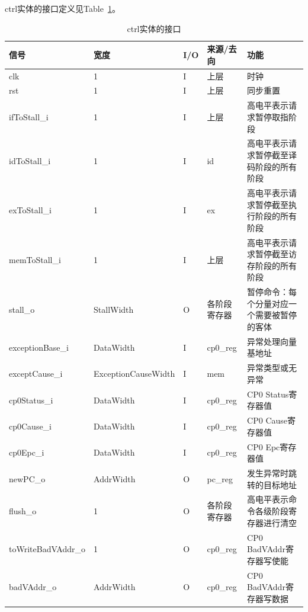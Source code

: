 \documentclass{article}
\begin{document}
\begin{spacing}{1.4}
ctrl实体的接口定义见Table~\ref{tb:ctrl-interface}。
\begin{table}[!htb]
\begin{center}
\begin{tabular*}{17cm}{l|l|l|l|p{5cm}}
\hline
\textbf{信号}&\textbf{宽度}&\textbf{I/O}&\textbf{来源/去向}&\textbf{功能} \\
\hline clk                     & 1                      & I     & 上层         & 时钟 \\
\hline rst                     & 1                      & I     & 上层         & 同步重置 \\
\hline ifToStall\_i            & 1                      & I     & 上层         & 高电平表示请求暂停取指阶段 \\
\hline idToStall\_i            & 1                      & I     & id           & 高电平表示请求暂停截至译码阶段的所有阶段 \\
\hline exToStall\_i            & 1                      & I     & ex           & 高电平表示请求暂停截至执行阶段的所有阶段 \\
\hline memToStall\_i           & 1                      & I     & 上层         & 高电平表示请求暂停截至访存阶段的所有阶段 \\
\hline stall\_o                & StallWidth             & O     & 各阶段寄存器 & 暂停命令：每个分量对应一个需要被暂停的客体 \\
\hline exceptionBase\_i        & DataWidth              & I     & cp0\_reg     & 异常处理向量基地址 \\
\hline exceptCause\_i          & ExceptionCauseWidth    & I     & mem          & 异常类型或无异常 \\
\hline cp0Status\_i            & DataWidth              & I     & cp0\_reg     & CP0 Status寄存器值 \\
\hline cp0Cause\_i             & DataWidth              & I     & cp0\_reg     & CP0 Cause寄存器值 \\
\hline cp0Epc\_i               & DataWidth              & I     & cp0\_reg     & CP0 Epc寄存器值 \\
\hline newPC\_o                & AddrWidth              & O     & pc\_reg      & 发生异常时跳转的目标地址 \\
\hline flush\_o                & 1                      & O     & 各阶段寄存器 & 高电平表示命令各级阶段寄存器进行清空 \\
\hline toWriteBadVAddr\_o      & 1                      & O     & cp0\_reg     & CP0 BadVAddr寄存器写使能 \\
\hline badVAddr\_o             & AddrWidth              & O     & cp0\_reg     & CP0 BadVAddr寄存器写数据 \\
\hline
\end{tabular*}
\caption{ctrl实体的接口}
\label{tb:ctrl-interface}
\end{center}
\end{table}


\end{spacing}
\end{document}

